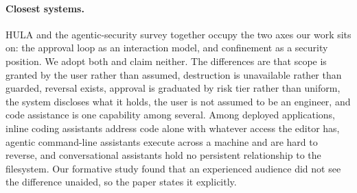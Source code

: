 \paragraph{Closest systems.}
HULA and the agentic-security survey together occupy the two axes our work sits on: the approval loop as an interaction model, and confinement as a security position. We adopt both and claim neither. The differences are that scope is granted by the user rather than assumed, destruction is unavailable rather than guarded, reversal exists, approval is graduated by risk tier rather than uniform, the system discloses what it holds, the user is not assumed to be an engineer, and code assistance is one capability among several. Among deployed applications, inline coding assistants address code alone with whatever access the editor has, agentic command-line assistants execute across a machine and are hard to reverse, and conversational assistants hold no persistent relationship to the filesystem. Our formative study found that an experienced audience did not see the difference unaided, so the paper states it explicitly.

